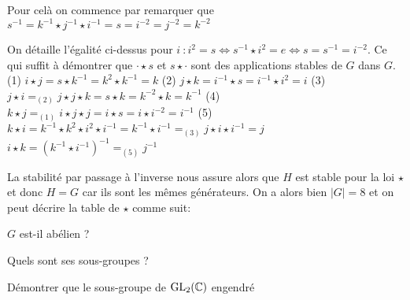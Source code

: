 \documentclass{report}
\begin{document}
\begin{exo}
\begin{q}{1}
{        Pour celà on commence par remarquer que \(s^{-1} = k^{-1}\star j^{-1}\star i^{-1} = s = i^{-2}=j^{-2}=k^{-2}\)
        \begin{enumerate}
            \itt On détaille l'égalité ci-dessus pour \(i\ \colon i^{2}=s\Leftrightarrow s^{-1}\star i^2=e\Leftrightarrow s=s^{-1}=i^{-2}\).
            Ce qui suffit à démontrer que \(\cdot\star s\) et \(s\star\cdot\) sont des
            applications stables de \(G\) dans \(G\).
            \itt(1) \(i\star j = s\star k^{-1} = k^2\star k^{-1}=k\)
            \itt(2) \(j\star k = i^{-1}\star s = i^{-1}\star i^2 = i\)
            \itt(3) \(j\star i =_{(2)} j\star j\star k = s\star k = k^{-2}\star k = k^{-1}\)
            \itt(4) \(k\star j =_{(1)} i\star j\star j = i\star s=i\star i^{-2}=i^{-1}\)
            \itt(5) \(k\star i = k^{-1} \star k^2\star i^2\star i^{-1} =k^{-1}\star i^{-1}=_{(3)} j \star i \star i^{-1}=j\)
            \itt \(i\star k = \left(k^{-1}\star i^{-1}\right)^{-1} =_{(5)} j^{-1}\)
        \end{enumerate}
        La stabilité par passage à l'inverse nous assure alors que \(H\) est
        stable pour la loi \(\star\) et donc \(H=G\) car ils sont les mêmes générateurs.
        On a alors bien \(|G|=8\) et on peut décrire la table de \(\star\) comme suit:
        }
    \end{q}
    \begin{q}{2}
        \(G\) est-il abélien ?
    \end{q}
    \begin{q}{3}
        Quels sont ses sous-groupes ?
    \end{q}
    \begin{q}{4}
        Démontrer que le sous-groupe de \(\mathrm{GL}_2(\mathbb{C})\) engendré

\end{q}
\end{exo}
\end{document}
